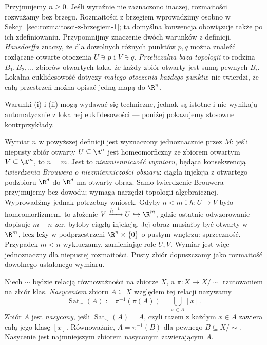 Przyjmujemy $n\geq0$. Jeśli wyraźnie nie zaznaczono inaczej,
rozmaitości rozważamy bez brzegu. Rozmaitości z brzegiem
wprowadzimy osobno w Sekcji~\ref{sec:rozmaitosci-z-brzegiem-1};
ta domyślna konwencja obowiązuje także po ich zdefiniowaniu.
Przypomnijmy znaczenie dwóch warunków z definicji.
\emph{Hausdorffa} znaczy, że dla dowolnych różnych punktów
$p,q$ można znaleźć rozłączne otwarte otoczenia $U\ni p$
i $V\ni q$. \emph{Przeliczalna baza topologii} to rodzina
$B_1,B_2,\ldots$ zbiorów otwartych taka, że każdy zbiór
otwarty jest sumą pewnych $B_i$. Lokalna euklidesowość
dotyczy \emph{małego otoczenia każdego punktu}; nie twierdzi,
że całą przestrzeń można opisać jedną mapą do $\R^n$.

Warunki (i) i (ii) mogą wydawać się techniczne, jednak są istotne i nie wynikają
automatycznie z lokalnej euklidesowości — poniżej pokazujemy stosowne kontrprzykłady.

\begin{uwaga}
Wymiar $n$ w powyższej definicji jest wyznaczony jednoznacznie przez $M$: jeśli niepusty
zbiór otwarty $U\subseteq\R^n$ jest homeomorficzny ze zbiorem otwartym $V\subseteq\R^m$, to
$n=m$. Jest to \emph{niezmienniczość wymiaru}, będąca konsekwencją
\emph{twierdzenia Brouwera o niezmienniczości obszaru}: ciągła injekcja
z otwartego podzbioru $\R^d$ do $\R^d$ ma otwarty obraz.
Samo twierdzenie Brouwera przyjmujemy bez dowodu; wymaga narzędzi
topologii algebraicznej. Wyprowadźmy jednak potrzebny wniosek.
Gdyby $n<m$ i $h:U\to V$ było homeomorfizmem, to złożenie
$V\xrightarrow{h^{-1}}U\hookrightarrow\R^m$, gdzie ostatnie
odwzorowanie dopisuje $m-n$ zer, byłoby ciągłą injekcją.
Jej obraz musiałby być otwarty w $\R^m$, lecz leży w podprzestrzeni
$\R^n\times\{0\}$ o pustym wnętrzu: sprzeczność.
Przypadek $m<n$ wykluczamy, zamieniając role $U,V$.
Wymiar jest więc jednoznaczny dla niepustej rozmaitości.
Pusty zbiór dopuszczamy jako rozmaitość dowolnego ustalonego wymiaru.
\end{uwaga}

\begin{definicja}\label{def:nasycenie}
Niech $\sim$ będzie relacją równoważności na zbiorze $X$,
a $\pi\colon X\to X/{\sim}$ rzutowaniem na zbiór klas.
\emph{Nasyceniem} zbioru $A\subseteq X$ względem tej relacji
nazywamy
\[
 \operatorname{Sat}_{\sim}(A)
 :=\pi^{-1}(\pi(A))
 =\bigcup_{x\in A}[x].
\]
Zbiór $A$ jest \emph{nasycony}, jeśli
$\operatorname{Sat}_{\sim}(A)=A$, czyli razem z każdym
$x\in A$ zawiera całą jego klasę $[x]$.
Równoważnie, $A=\pi^{-1}(B)$ dla pewnego
$B\subseteq X/{\sim}$. Nasycenie jest najmniejszym
zbiorem nasyconym zawierającym $A$.
\end{definicja}

